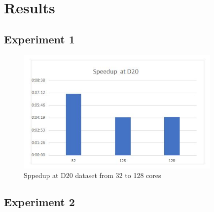 \chapter{Results}

\section{Experiment 1}
\begin{figure}[ht]
\includegraphics[width=10cm]{Thesis/figures/graph1.JPG}
\caption{Sppedup at D20 dataset from 32 to 128 cores}
\label{fig:graph}
\end{figure}



\section{Experiment 2}

